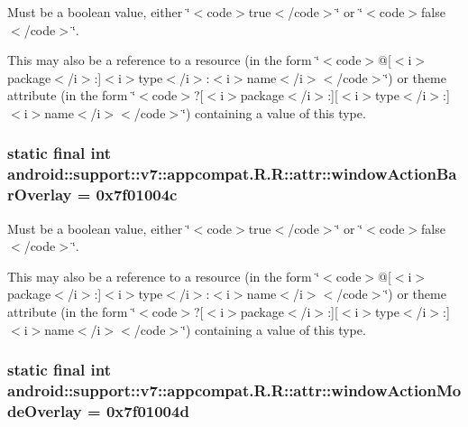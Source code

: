 Must be a boolean value, either \char`\"{}$<$code$>$true$<$/code$>$\char`\"{} or \char`\"{}$<$code$>$false$<$/code$>$\char`\"{}. 

This may also be a reference to a resource (in the form \char`\"{}$<$code$>$@\mbox{[}$<$i$>$package$<$/i$>$:\mbox{]}$<$i$>$type$<$/i$>$:$<$i$>$name$<$/i$>$$<$/code$>$\char`\"{}) or theme attribute (in the form \char`\"{}$<$code$>$?\mbox{[}$<$i$>$package$<$/i$>$:\mbox{]}\mbox{[}$<$i$>$type$<$/i$>$:\mbox{]}$<$i$>$name$<$/i$>$$<$/code$>$\char`\"{}) containing a value of this type. \hypertarget{classandroid_1_1support_1_1v7_1_1appcompat_1_1_r_1_1attr_f2feda86cff0b8afd2fc04e62d9c4d49}{
\subsubsection[{windowActionBarOverlay}]{\setlength{\rightskip}{0pt plus 5cm}static final int android::support::v7::appcompat.R.R::attr::windowActionBarOverlay = 0x7f01004c}}
\label{classandroid_1_1support_1_1v7_1_1appcompat_1_1_r_1_1attr_f2feda86cff0b8afd2fc04e62d9c4d49}


Must be a boolean value, either \char`\"{}$<$code$>$true$<$/code$>$\char`\"{} or \char`\"{}$<$code$>$false$<$/code$>$\char`\"{}. 

This may also be a reference to a resource (in the form \char`\"{}$<$code$>$@\mbox{[}$<$i$>$package$<$/i$>$:\mbox{]}$<$i$>$type$<$/i$>$:$<$i$>$name$<$/i$>$$<$/code$>$\char`\"{}) or theme attribute (in the form \char`\"{}$<$code$>$?\mbox{[}$<$i$>$package$<$/i$>$:\mbox{]}\mbox{[}$<$i$>$type$<$/i$>$:\mbox{]}$<$i$>$name$<$/i$>$$<$/code$>$\char`\"{}) containing a value of this type. \hypertarget{classandroid_1_1support_1_1v7_1_1appcompat_1_1_r_1_1attr_01586bd7b1fbd6c70589b76af0f9c8fb}{
\subsubsection[{windowActionModeOverlay}]{\setlength{\rightskip}{0pt plus 5cm}static final int android::support::v7::appcompat.R.R::attr::windowActionModeOverlay = 0x7f01004d}}
\label{classandroid_1_1support_1_1v7_1_1appcompat_1_1_r_1_1attr_01586bd7b1fbd6c70589b76af0f9c8fb}


